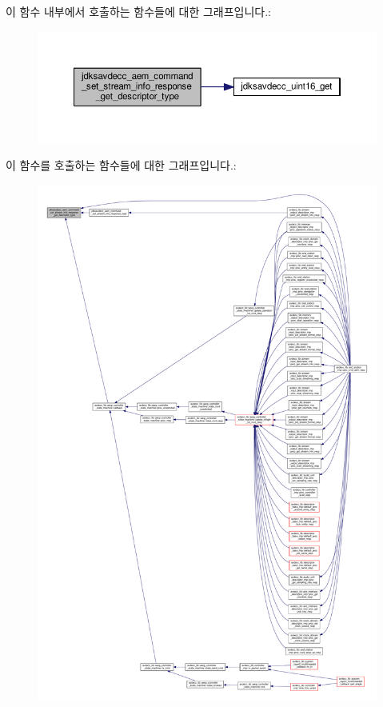 이 함수 내부에서 호출하는 함수들에 대한 그래프입니다.\+:
\nopagebreak
\begin{figure}[H]
\begin{center}
\leavevmode
\includegraphics[width=350pt]{group__command__set__stream__info__response_ga2af288f63567f10108700f344f7ed7c2_cgraph}
\end{center}
\end{figure}




이 함수를 호출하는 함수들에 대한 그래프입니다.\+:
\nopagebreak
\begin{figure}[H]
\begin{center}
\leavevmode
\includegraphics[width=350pt]{group__command__set__stream__info__response_ga2af288f63567f10108700f344f7ed7c2_icgraph}
\end{center}
\end{figure}


